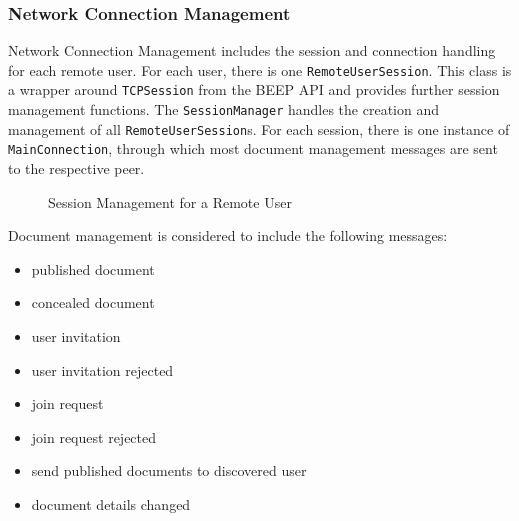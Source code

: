 \subsubsection{Network Connection Management}
Network Connection Management includes the session and connection handling for each remote user. For each user, there is one \texttt{Remote\-User\-Session}. This class is a wrapper around \texttt{TCPSession} from the BEEP API and provides further session management functions. The \texttt{Session\-Manager} handles the creation and management of all \texttt{Remote\-User\-Session}s. For each session, there is one instance of \texttt{MainConnection}, through which most document management messages are sent to the respective peer. 

\begin{figure}[H]
 \centering
 \caption{Session Management for a Remote User}
 \label{fig:network.discovery.sessionmanagement}
\end{figure}

Document management is considered to include the following messages:
\begin{itemize}
\item published document
\item concealed document
\item user invitation
\item user invitation rejected
\item join request
\item join request rejected
\item send published documents to discovered user
\item document details changed
\end{itemize}

